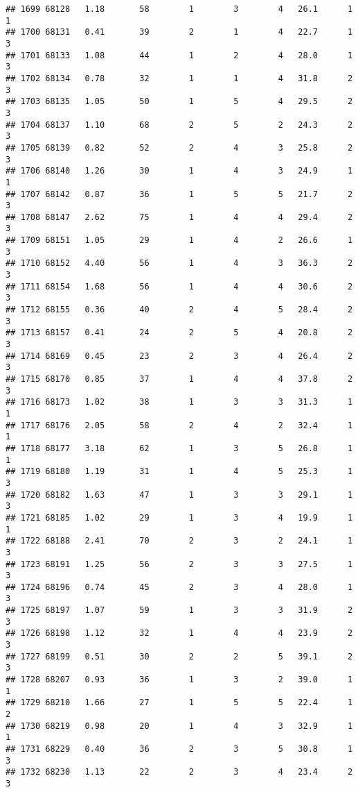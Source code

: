\documentclass[
]{article}
\begin{document}
\begin{verbatim}
## 1699 68128   1.18       58        1        3        4   26.1      1      1
## 1700 68131   0.41       39        2        1        4   22.7      1      3
## 1701 68133   1.08       44        1        2        4   28.0      1      3
## 1702 68134   0.78       32        1        1        4   31.8      2      3
## 1703 68135   1.05       50        1        5        4   29.5      2      3
## 1704 68137   1.10       68        2        5        2   24.3      2      3
## 1705 68139   0.82       52        2        4        3   25.8      2      3
## 1706 68140   1.26       30        1        4        3   24.9      1      1
## 1707 68142   0.87       36        1        5        5   21.7      2      3
## 1708 68147   2.62       75        1        4        4   29.4      2      3
## 1709 68151   1.05       29        1        4        2   26.6      1      3
## 1710 68152   4.40       56        1        4        3   36.3      2      3
## 1711 68154   1.68       56        1        4        4   30.6      2      3
## 1712 68155   0.36       40        2        4        5   28.4      2      3
## 1713 68157   0.41       24        2        5        4   20.8      2      3
## 1714 68169   0.45       23        2        3        4   26.4      2      3
## 1715 68170   0.85       37        1        4        4   37.8      2      3
## 1716 68173   1.02       38        1        3        3   31.3      1      1
## 1717 68176   2.05       58        2        4        2   32.4      1      1
## 1718 68177   3.18       62        1        3        5   26.8      1      1
## 1719 68180   1.19       31        1        4        5   25.3      1      3
## 1720 68182   1.63       47        1        3        3   29.1      1      3
## 1721 68185   1.02       29        1        3        4   19.9      1      1
## 1722 68188   2.41       70        2        3        2   24.1      1      3
## 1723 68191   1.25       56        2        3        3   27.5      1      3
## 1724 68196   0.74       45        2        3        4   28.0      1      3
## 1725 68197   1.07       59        1        3        3   31.9      2      3
## 1726 68198   1.12       32        1        4        4   23.9      2      3
## 1727 68199   0.51       30        2        2        5   39.1      2      3
## 1728 68207   0.93       36        1        3        2   39.0      1      1
## 1729 68210   1.66       27        1        5        5   22.4      1      2
## 1730 68219   0.98       20        1        4        3   32.9      1      1
## 1731 68229   0.40       36        2        3        5   30.8      1      3
## 1732 68230   1.13       22        2        3        4   23.4      2      3

\end{verbatim}
\end{document}
